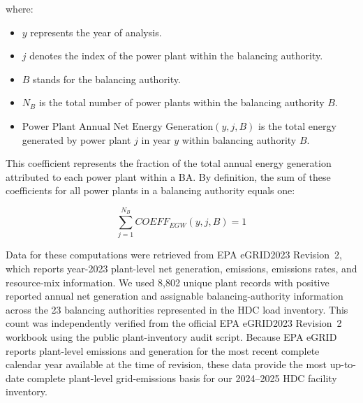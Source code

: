 \documentclass[12pt]{article}
\begin{document}






where:
\begin{itemize}
    \item $y$ represents the year of analysis.
    \item $j$ denotes the index of the power plant within the balancing authority.
    \item $B$ stands for the balancing authority.
    \item $N_B$ is the total number of power plants within the balancing authority $B$.
    \item $\text{Power Plant Annual Net Energy Generation}(y, j, B)$ is the total energy generated by power plant $j$ in year $y$ within balancing authority $B$.
\end{itemize}

This coefficient represents the fraction of the total annual energy generation attributed to each power plant within a BA. By definition, the sum of these coefficients for all power plants in a balancing authority equals one:

\[
\sum_{j=1}^{N_B} COEFF_{EGW}(y, j, B) = 1
\]

Data for these computations were retrieved from EPA eGRID2023 Revision~2, which reports year-2023 plant-level net generation, emissions, emissions rates, and resource-mix information. We used 8,802 unique plant records with positive reported annual net generation and assignable balancing-authority information across the 23 balancing authorities represented in the HDC load inventory. This count was independently verified from the official EPA eGRID2023 Revision~2 workbook using the public plant-inventory audit script. Because EPA eGRID reports plant-level emissions and generation for the most recent complete calendar year available at the time of revision, these data provide the most up-to-date complete plant-level grid-emissions basis for our 2024--2025 HDC facility inventory.
\end{document}
